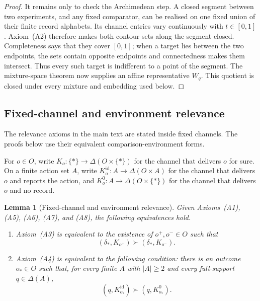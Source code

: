 \documentclass[11pt,a4paper]{article}
\newtheorem{lemma}[theorem]{Lemma}
\theoremstyle{definition}
\newcommand{\D}{\Delta}
\newcommand{\1}{\mathbf 1}
\begin{document}
\begin{proof}
It remains only to check the Archimedean step.  A closed segment between two
experiments, and any fixed comparator, can be realised on one fixed union of
their finite record alphabets.  Its channel entries vary continuously with
$t\in[0,1]$.
Axiom~\textup{(A2)} therefore makes both contour sets along the segment closed.
Completeness says that they cover $[0,1]$; when a target lies between the two
endpoints, the sets contain opposite endpoints and connectedness makes them
intersect.  Thus every such target is indifferent to a point of the segment.
The mixture-space theorem \cite{HersteinMilnor1953} now supplies an affine
representative $W_q$.  This
quotient is closed under every mixture and embedding used below.
\end{proof}

\subsection{Fixed-channel and environment relevance}

The relevance axioms in the main text are stated inside fixed channels.  The
proofs below use their equivalent comparison-environment forms.

For $o\in O$, write $K_o:\{\ast\}\to\D(O\times\{\ast\})$ for the channel that
delivers $o$ for sure.  On a finite action set $A$, write
$K^{\mathrm{id}}_o:A\to\D(O\times A)$ for the channel that delivers $o$ and
reports the action, and $K^0_o:A\to\D(O\times\{\ast\})$ for the channel that
delivers $o$ and no record.

\begin{lemma}[Fixed-channel and environment relevance]\label{lem:relevance-bridge}
Given Axioms~\textup{(A1)}, \textup{(A5)}, \textup{(A6)},
\textup{(A7)}, and \textup{(A8)}, the following equivalences hold.
\begin{enumerate}[label=\textup{(\alph*)},leftmargin=*]
\item Axiom~\textup{(A3)} is equivalent to the existence of
  $o^+,o^-\in O$ such that
  \[
    (\delta_\ast,K_{o^+})\succ(\delta_\ast,K_{o^-}).
  \]
\item Axiom~\textup{(A4)} is equivalent to the following condition: there is
  an outcome $o_\ast\in O$ such that, for every finite $A$ with $|A|\ge2$
  and every full-support $q\in\D(A)$,
  \[
    (q,K^{\mathrm{id}}_{o_\ast})\succ(q,K^0_{o_\ast}).
  \]
\end{enumerate}
\end{lemma}
\end{document}
